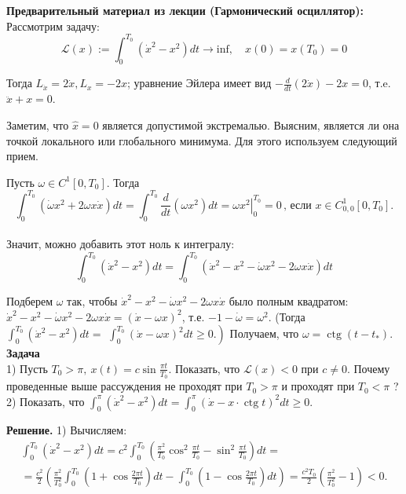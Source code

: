 \begin{task}
\textbf{Предварительный материал из лекции (Гармонический осциллятор):}\\
Рассмотрим задачу:
$$
\mathcal{L}(x):=\int_{0}^{T_{0}}\left(\dot{x}^{2}-x^{2}\right) d t \rightarrow \mathrm{inf}, \quad x(0)=x\left(T_{0}\right)=0
$$

Тогда $L_{\dot{x}}=2 \dot{x}, L_{x}=-2 x$; уравнение Эйлера имеет вид $-\frac{d}{d t}(2 \dot{x})-2 x=0$, т.e. $\ddot{x}+x=0$.

Заметим, что $\hat{x}=0$ является допустимой экстремалью. Выясним, является ли она точкой локального или глобального минимума. Для этого используем следующий прием.

Пусть $\omega \in C^{1}\left[0, T_{0}\right]$. Тогда $$\int_{0}^{T_{0}} \left(\dot{\omega} x^{2}+2 \omega x \dot{x} \right)d t=\int_{0}^{T_{0}} \frac{d}{d t}\left(\omega x^{2}\right) d t=\left.\omega x^{2}\right|_{0} ^{T_{0}}=0\, \text{, если } x \in C_{0,0}^{1}\left[0, T_{0}\right].$$ \\
Значит, можно добавить этот ноль к интегралу:
$$
\int_{0}^{T_{0}}\left(\dot{x}^{2}-x^{2}\right) d t=\int_{0}^{T_{0}}\left(\dot{x}^{2}-x^{2}-\dot{\omega} x^{2}-2 \omega x \dot{x}\right) d t
$$

Подберем $\omega$ так, чтобы $\dot{x}^{2}-x^{2}-\dot{\omega} x^{2}-2 \omega x \dot{x}$ было полным квадратом: $\dot{x}^{2}-x^{2}-\dot{\omega} x^{2}-2 \omega x \dot{x}=(\dot{x}-\omega x)^{2}$, т.е. $-1-\dot{\omega}=\omega^{2}$. (Тогда $\int_{0}^{T_{0}}\left(\dot{x}^{2}-x^{2}\right) d t=$ $\left.\int_{0}^{T_{0}}(\dot{x}-\omega x)^{2} d t \geq 0.\right)$ Получаем, что $\omega=\operatorname{ctg}\left(t-t_{*}\right)$.
\\
\textbf{Задача}\\

1) Пусть $T_{0}>\pi,\ x(t)=c \sin \frac{\pi t}{T_{0}}$. Показать, что $\mathcal{L}(x)<0$ при $c \neq 0$. Почему проведенные выше рассуждения не проходят при $T_{0}>\pi$ и проходят при $T_{0}<\pi$ ?\\
2) Показать, что $\int_{0}^{\pi}\left(\dot{x}^{2}-x^{2}\right) d t=\int_{0}^{\pi}(\dot{x}-x \cdot \operatorname{ctg} t)^{2} d t \geqslant 0$.

\textbf{Решение.} 1) Вычисляем:
$$
\begin{gathered}
\int_{0}^{T_{0}}\left(\dot{x}^{2}-x^{2}\right) d t=c^{2} \int_{0}^{T_{0}}\left(\frac{\pi^{2}}{T_{0}} \cos ^{2} \frac{\pi t}{T_{0}}-\sin ^{2} \frac{\pi t}{T_{0}}\right) d t= \\
=\frac{c^{2}}{2}\left(\frac{\pi^{2}}{T_{0}^{2}} \int_{0}^{T_{0}}\left(1+\cos \frac{2 \pi t}{T_{0}}\right) d t-\int_{0}^{T_{0}}\left(1-\cos \frac{2 \pi t}{T_{0}}\right) d t\right)=\frac{c^{2} T_{0}}{2}\left(\frac{\pi^{2}}{T_{0}^{2}}-1\right)<0 .
\end{gathered}
$$


\end{task}
